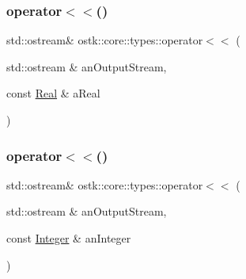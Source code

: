 \mbox{\label{namespaceostk_1_1core_1_1types_aad8731f130ecdac51a06cbabd65d25b5}} 
\subsubsection{\texorpdfstring{operator$<$$<$()}{operator<<()}\hspace{0.1cm}{\footnotesize\ttfamily [1/2]}}
{\footnotesize\ttfamily std\+::ostream\& ostk\+::core\+::types\+::operator$<$$<$ (\begin{DoxyParamCaption}\item[{std\+::ostream \&}]{an\+Output\+Stream,  }\item[{const \hyperlink{classostk_1_1core_1_1types_1_1_real}{Real} \&}]{a\+Real }\end{DoxyParamCaption})}

\mbox{\label{namespaceostk_1_1core_1_1types_acf7f4eddbe4d6646e0ad71c489c77115}} 
\subsubsection{\texorpdfstring{operator$<$$<$()}{operator<<()}\hspace{0.1cm}{\footnotesize\ttfamily [2/2]}}
{\footnotesize\ttfamily std\+::ostream\& ostk\+::core\+::types\+::operator$<$$<$ (\begin{DoxyParamCaption}\item[{std\+::ostream \&}]{an\+Output\+Stream,  }\item[{const \hyperlink{classostk_1_1core_1_1types_1_1_integer}{Integer} \&}]{an\+Integer }\end{DoxyParamCaption})}

